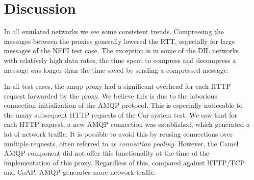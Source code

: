 \begin{landscape}
    \begin{figure}
    \centering
    \begin{floatrow}
    \end{floatrow}
    \end{figure}
\end{landscape}

\section{Discussion}
\label{section:evaluation-discussion}

In all emulated networks we see some consistent trends. Compressing the messages
between the proxies generally lowered the RTT, especially for large messages of
the NFFI test case. The exception is in some of the DIL networks with relatively
high data rates, the time spent to compress and decompress a message was longer
than the time saved by sending a compressed message.

In all test cases, the \gls{amqp} proxy had a significant overhead for each HTTP request
forwarded by the proxy. We believe this is due to the laborious connection
initialization of the AMQP protocol. This is especially noticeable to the many
subsequent HTTP requests of the Car system test. We saw that for each HTTP
request, a new AMQP connection was established, which generated a lot of network
traffic. It is possible to avoid this by reusing connections over multiple
requests, often referred to as \textit{connection pooling}. However, the Camel
AMQP component did not offer this functionality at the time of the
implementation of this proxy. Regardless of this, compared against HTTP/TCP and
CoAP, AMQP generates more network traffic.

